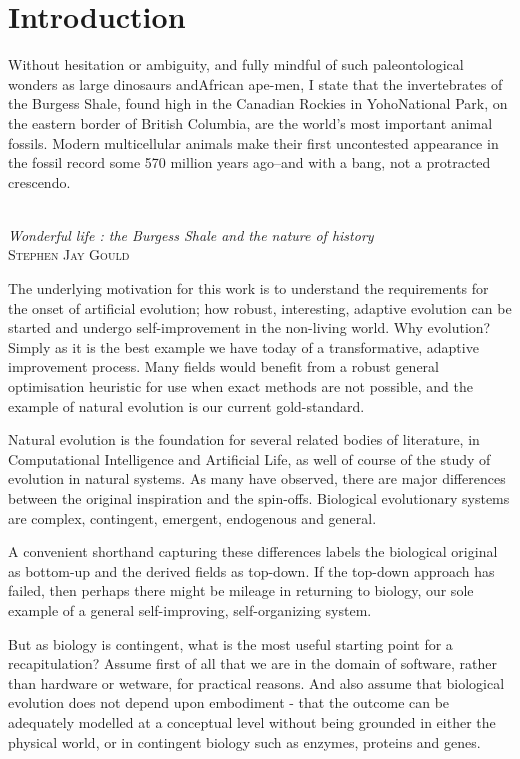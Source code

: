 \chapter{Introduction}\label{introduction}

\settowidth{\epigraphwidth}{Wonderful life : the Burgess Shale and the nature of history}
\epigraph{%
Without hesitation or ambiguity, and fully mindful of such paleontological wonders as large dinosaurs andAfrican ape-men, I state that the invertebrates of the Burgess Shale, found high in the Canadian Rockies in YohoNational Park, on the eastern border of British Columbia, are the world's most important animal fossils. Modern multicellular animals make their first uncontested appearance in the fossil record some 570 million years ago--and with a bang, not a protracted crescendo.}%
{\textit{\\Wonderful life : the Burgess Shale and the nature of history}\\\textsc{Stephen Jay Gould}}

The underlying motivation for this work is to understand the requirements for the onset of artificial evolution; how robust, interesting, adaptive evolution can be started and undergo self-improvement in the non-living world. Why evolution? Simply as it is the best example we have today of a transformative, adaptive improvement process. Many fields would benefit from a robust general optimisation heuristic for use when exact methods are not possible, and the example of natural evolution is our current gold-standard. 

Natural evolution is the foundation for several related bodies of literature, in Computational Intelligence and Artificial Life, as well of course of the study of evolution in natural systems. As many have observed, there are major differences between the original inspiration and the spin-offs. Biological evolutionary systems are complex, contingent, emergent, endogenous and general. 

A convenient shorthand capturing these differences labels the biological original as bottom-up and the derived fields as top-down. If the top-down approach has failed, then perhaps there might be mileage in returning to biology, our sole example of a general self-improving, self-organizing system.

But as biology is contingent, what is the most useful starting point for a recapitulation? Assume first of all that we are in the domain of software, rather than hardware or wetware, for practical reasons. And also assume that biological evolution does not depend upon embodiment - that the outcome can be adequately modelled at a conceptual level without being grounded in either the physical world, or in contingent biology such as enzymes, proteins and genes.

